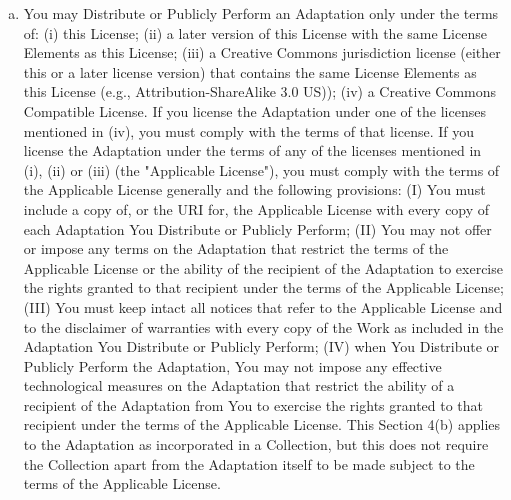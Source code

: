 \begin{enumerate}[a.]
          \item You may Distribute or Publicly Perform an Adaptation
          only under the terms of: (i) this License; (ii) a later
          version of this License with the same License Elements as
          this License; (iii) a Creative Commons jurisdiction
          license (either this or a later license version) that
          contains the same License Elements as this License (e.g.,
          Attribution-ShareAlike 3.0 US)); (iv) a Creative Commons
          Compatible License. If you license the Adaptation under
          one of the licenses mentioned in (iv), you must comply
          with the terms of that license. If you license the
          Adaptation under the terms of any of the licenses
          mentioned in (i), (ii) or (iii) (the "Applicable
          License"), you must comply with the terms of the
          Applicable License generally and the following
          provisions: (I) You must include a copy of, or the URI
          for, the Applicable License with every copy of each
          Adaptation You Distribute or Publicly Perform; (II) You
          may not offer or impose any terms on the Adaptation that
          restrict the terms of the Applicable License or the
          ability of the recipient of the Adaptation to exercise
          the rights granted to that recipient under the terms of
          the Applicable License; (III) You must keep intact all
          notices that refer to the Applicable License and to the
          disclaimer of warranties with every copy of the Work as
          included in the Adaptation You Distribute or Publicly
          Perform; (IV) when You Distribute or Publicly Perform the
          Adaptation, You may not impose any effective
          technological measures on the Adaptation that restrict
          the ability of a recipient of the Adaptation from You to
          exercise the rights granted to that recipient under the
          terms of the Applicable License. This Section 4(b)
          applies to the Adaptation as incorporated in a
          Collection, but this does not require the Collection
          apart from the Adaptation itself to be made subject to
          the terms of the Applicable License.


\end{enumerate}
